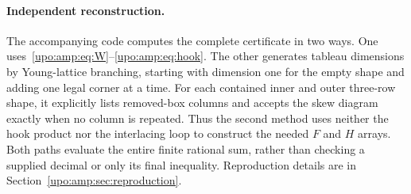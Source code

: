 \documentclass[11pt,letterpaper]{article}
\theoremstyle{remark}\newtheorem{remark}[theorem]{Remark}
\numberwithin{equation}{section}
\begin{document}
\paragraph{Independent reconstruction.}
The accompanying code computes the complete certificate in two ways.
One uses~\eqref{upo:amp:eq:W}--\eqref{upo:amp:eq:hook}. The other generates tableau
dimensions by Young-lattice branching, starting with dimension one for
the empty shape and adding one legal corner at a time. For each contained
inner and outer three-row shape, it explicitly lists removed-box columns
and accepts the skew diagram exactly when no column is repeated.
Thus the second method uses neither the hook product nor the interlacing
loop to construct the needed $F$ and $H$ arrays. Both paths evaluate the
entire finite rational sum, rather than checking a supplied decimal or
only its final inequality. Reproduction details are in
Section~\ref{upo:amp:sec:reproduction}.
\end{document}
